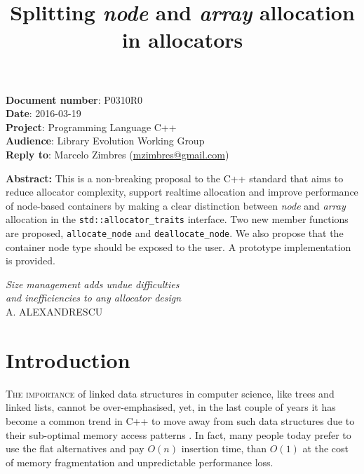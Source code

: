 \documentclass[11pt]{article}
\begin{document}
\date{}
\title{\bf Splitting {\it node} and {\it array} allocation in allocators}
\maketitle
\noindent
{\bf Document number}:  P0310R0 \\
{\bf Date}:  2016-03-19\\ %
{\bf Project}: Programming Language C++ \\
{\bf Audience}: Library Evolution Working Group \\
{\bf Reply to}: Marcelo Zimbres (\href{mailto:mzimbres@gmail.com}{mzimbres@gmail.com}) 

\vspace{1cm}

\noindent
{\bf Abstract: }This is a non-breaking proposal to the C++ standard that aims
to reduce allocator complexity, support realtime allocation and improve
performance of node-based containers by making a clear distinction between {\it node}
and {\it array} allocation in the \texttt{std::allocator\_traits} interface.
Two new member functions are proposed, \texttt{allocate\_node} and
\texttt{deallocate\_node}. We also propose that the container node type should
be exposed to the user. A prototype implementation is provided.

\vfill
\begin{flushright}
\noindent
{\it Size management adds undue difficulties \\
     and inefficiencies to any allocator design} \\
A. ALEXANDRESCU \\
\medskip
{\it }
\end{flushright}
\medskip

\newpage
\tableofcontents

\newpage
\section{Introduction}
\textsc{The importance} of linked data structures in computer science, like
trees and linked lists, cannot be over-emphasised, yet, in the last couple of
years it has become a common trend in C++ to move away from such data
structures due to their sub-optimal memory access patterns \cite{middleditch,
chandler, meyers}.  In fact, many people today prefer to use the flat
alternatives and pay $O(n)$ insertion time, than $O(1)$ at the cost of memory
fragmentation and unpredictable performance loss.  
\end{document}
